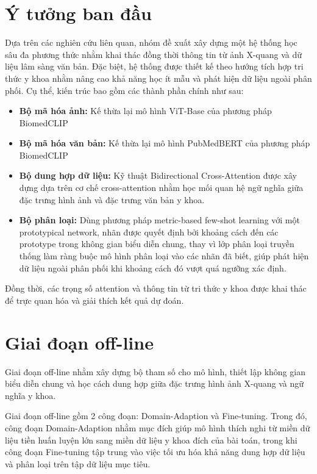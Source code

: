 \section{Ý tưởng ban đầu} 

Dựa trên các nghiên cứu liên quan, nhóm đề xuất xây dựng một hệ thống học sâu đa phương thức nhằm khai thác đồng thời thông tin từ ảnh X-quang và dữ liệu lâm sàng văn bản. Đặc biệt, hệ thống được thiết kế theo hướng tích hợp tri thức y khoa nhằm nâng cao khả năng học ít mẫu và phát hiện dữ liệu ngoài phân phối. Cụ thể, kiến trúc bao gồm các thành phần chính như sau:
    \begin{itemize}
        \item \textbf{Bộ mã hóa ảnh:} Kế thừa lại mô hình ViT-Base của phương pháp BiomedCLIP \cite{BiomedCLIP}
        \item \textbf{Bộ mã hóa văn bản:} Kế thừa lại mô hình PubMedBERT của phương pháp BiomedCLIP \cite{BiomedCLIP}
        \item \textbf{Bộ dung hợp dữ liệu:} Kỹ thuật Bidirectional Cross-Attention được xây dựng dựa trên cơ chế cross-attention 
        nhằm học mối quan hệ ngữ nghĩa giữa đặc trưng hình ảnh và đặc trưng văn bản y khoa.
        \item \textbf{Bộ phân loại:} Dùng phương pháp metric-based few-shot learning với một prototypical network, 
        nhãn được quyết định bởi khoảng cách đến các prototype trong không gian biểu diễn chung, 
        thay vì lớp phân loại truyền thống làm ràng buộc mô hình phân loại vào các nhãn đã biết, 
        giúp phát hiện dữ liệu ngoài phân phối khi khoảng cách đó vượt quá ngưỡng xác định.

    \end{itemize}
    Đồng thời, các trọng số attention và thông tin từ tri thức y khoa được khai thác để trực quan hóa và giải thích kết quả dự đoán.

\section{Giai đoạn off-line}
Giai đoạn off-line nhằm xây dựng bộ tham số cho mô hình, thiết lập không gian biểu diễn chung và học cách dung hợp giữa đặc trưng hình ảnh X-quang và ngữ nghĩa y khoa.

Giai đoạn off-line gồm 2 công đoạn: Domain-Adaption và Fine-tuning. 
Trong đó, công đoạn Domain-Adaption nhằm mục đích giúp mô hình thích nghi từ miền dữ liệu tiền huấn luyện lớn sang miền dữ liệu y khoa đích của bài toán, 
trong khi công đoạn Fine-tuning tập trung vào việc tối ưu hóa khả năng dung hợp dữ liệu 
và phân loại trên tập dữ liệu mục tiêu.

